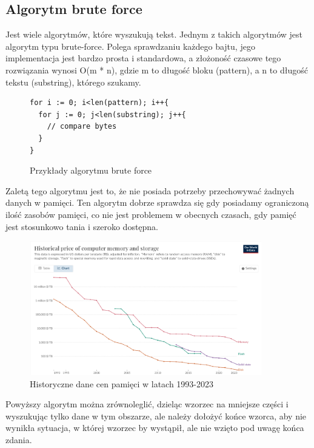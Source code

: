 \subsection{Algorytm brute force}

Jest wiele algorytmów, które wyszukują tekst. Jednym z takich algorytmów jest 
algorytm typu brute-force. Polega sprawdzaniu każdego bajtu, jego implementacja
jest bardzo prosta i standardowa, a złożoność czasowe tego rozwiązania wynosi
O(m * n), gdzie m to długość bloku (pattern), a n to długość tekstu (substring),
którego szukamy. 

\begin{figure}[h]
  \centering
  \begin{lstlisting}
for i := 0; i<len(pattern); i++{
  for j := 0; j<len(substring); j++{
    // compare bytes
  }
}
  \end{lstlisting}
  \caption{Przykłady algorytmu brute force}
  \label{fig:code:bruteForceComparison}
\end{figure}

Zaletą tego algorytmu jest to, że nie posiada potrzeby przechowywać żadnych 
danych w pamięci. Ten algorytm dobrze sprawdza się gdy posiadamy ograniczoną 
ilość zasobów pamięci, co nie jest problemem w obecnych czasach, gdy pamięć jest
stosunkowo tania i szeroko dostępna.
\begin{figure}[h]
  \centering
  \includegraphics[width=0.9\textwidth]{./images/historical-mem-price.png}
  \caption{Historyczne dane cen pamięci w latach 1993-2023 \cite{internet:HistoricalMemPrice}}
  \label{screenshot:MemPrices}
\end{figure}

Powyższy algorytm można zrównoleglić, dzieląc wzorzec na mniejsze części
i wyszukując tylko dane w tym obszarze, ale należy dołożyć końce wzorca, aby nie
wynikła sytuacja, w której wzorzec by wystąpił, ale nie wzięto pod uwagę końca 
zdania. 

